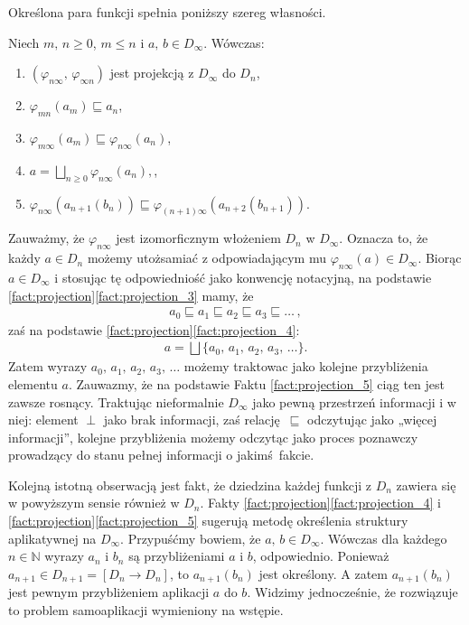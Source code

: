 Określona para funkcji spełnia poniższy szereg własności.

\begin{fakt}\label{fact:projection}%
Niech \(m,\,n\geq 0\), \(m\leq n\) i \(a,\,b\in D_\infty\). Wówczas:
\begin{enumerate}[label={(\roman*)}, ref={(\roman*)}] 
  \setlength\itemsep{0em}
  \item \((\varphi_{n\infty},\,\varphi_{\infty n})\) jest projekcją z \(D_\infty\) do \(D_n\),\label{fact:projection_1}
\item \(\varphi_{mn}(a_m)\sqsubseteq a_n\),\label{fact:projection_2}
\item \(\varphi_{m\infty}(a_m)\sqsubseteq \varphi_{n\infty}(a_n)\),\label{fact:projection_3}
\item \(a=\bigsqcup_{n\geq 0}\varphi_{n\infty}(a_n),\),\label{fact:projection_4}
\item \(\varphi_{n\infty}(a_{n+1}(b_n))\sqsubseteq\varphi_{(n+1)\infty}(a_{n+2}(b_{n+1}))\).\label{fact:projection_5}
\end{enumerate}
\end{fakt}

Zauważmy, że \(\varphi_{n\infty}\) jest izomorficznym włożeniem \(D_n\) w \(D_\infty\). Oznacza to, że każdy \(a\in D_n\) możemy utożsamiać z odpowiadającym mu \(\varphi_{n\infty}(a)\in D_\infty\). Biorąc \(a\in D_\infty\) i stosując tę odpowiedniość jako konwencję notacyjną, na podstawie \ref{fact:projection}\ref{fact:projection_3} mamy, że
\begin{align*}
 a_0 \sqsubseteq  a_1 \sqsubseteq a_2 \sqsubseteq a_3 \sqsubseteq \dots\,,
\end{align*}
zaś na podstawie \ref{fact:projection}\ref{fact:projection_4}:
\begin{align*}
  a=\bigsqcup\{a_0,\,a_1,\,a_2,\,a_3,\,\dots\}.
\end{align*}
Zatem wyrazy \(a_0,\,a_1,\,a_2,\,a_3,\,\dots\) możemy traktowac jako kolejne przybliżenia elementu \(a\). Zauwazmy, że na podstawie Faktu \ref{fact:projection_5} ciąg ten jest zawsze rosnący. Traktując nieformalnie \(D_\infty\) jako pewną przestrzeń informacji i w niej: element \(\perp\) jako brak informacji, zaś relację \(\sqsubseteq\) odczytując jako „więcej informacji”, kolejne przybliżenia możemy odczytąc jako proces poznawczy prowadzący do stanu pełnej informacji o jakimś fakcie.  

Kolejną istotną obserwacją jest fakt, że dziedzina każdej funkcji z \(D_n\) zawiera się w powyższym sensie również w \(D_n\). Fakty \ref{fact:projection}\ref{fact:projection_4} i \ref{fact:projection}\ref{fact:projection_5} sugerują metodę określenia struktury aplikatywnej na \(D_\infty\). Przypuśćmy bowiem, że \(a,\,b\in D_\infty\). Wówczas dla każdego \(n\in\mathbb{N}\) wyrazy \(a_n\) i \(b_n\) są przybliżeniami \(a\) i \(b\), odpowiednio. Ponieważ \(a_{n+1}\in  D_{n+1}=[D_n\to D_n]\), to \(a_{n+1}(b_n)\) jest określony. A zatem \(a_{n+1}(b_n)\) jest pewnym przybliżeniem aplikacji \(a\) do \(b\). Widzimy jednocześnie, że rozwiązuje to problem samoaplikacji wymieniony na wstępie. 

